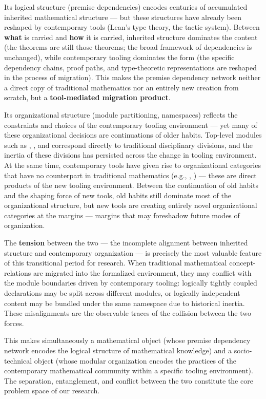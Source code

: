 Its logical structure (premise dependencies) encodes centuries of accumulated inherited mathematical structure — but these structures have already been reshaped by contemporary tools (Lean's type theory, the tactic system). Between \textbf{what} is carried and \textbf{how} it is carried, inherited structure dominates the content (the theorems are still those theorems; the broad framework of dependencies is unchanged), while contemporary tooling dominates the form (the specific dependency chains, proof paths, and type-theoretic representations are reshaped in the process of migration). This makes the premise dependency network neither a direct copy of traditional mathematics nor an entirely new creation from scratch, but a \textbf{tool-mediated migration product}.

Its organizational structure (module partitioning, namespaces) reflects the constraints and choices of the contemporary tooling environment — yet many of these organizational decisions are continuations of older habits. Top-level modules such as , , and  correspond directly to traditional disciplinary divisions, and the inertia of these divisions has persisted across the change in tooling environment. At the same time, contemporary tools have given rise to organizational categories that have no counterpart in traditional mathematics (e.g., , ) — these are direct products of the new tooling environment. Between the continuation of old habits and the shaping force of new tools, old habits still dominate most of the organizational structure, but new tools are creating entirely novel organizational categories at the margins — margins that may foreshadow future modes of organization.

The \textbf{tension} between the two — the incomplete alignment between inherited structure and contemporary organization — is precisely the most valuable feature of this transitional period for research. When traditional mathematical concept-relations are migrated into the formalized environment, they may conflict with the module boundaries driven by contemporary tooling: logically tightly coupled declarations may be split across different modules, or logically independent content may be bundled under the same namespace due to historical inertia. These misalignments are the observable traces of the collision between the two forces.

This makes  simultaneously a mathematical object (whose premise dependency network encodes the logical structure of mathematical knowledge) and a socio-technical object (whose modular organization encodes the practices of the contemporary mathematical community within a specific tooling environment). The separation, entanglement, and conflict between the two constitute the core problem space of our research.
